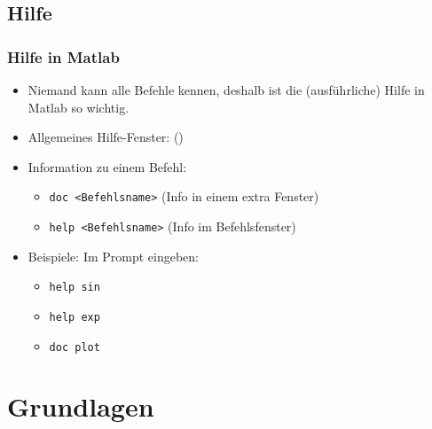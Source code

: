     \subsection{Hilfe}
    \begin{frame}
      \frametitle{Hilfe in Matlab}
      \begin{itemize}
        \itemsep0.3cm
        \item Niemand kann alle Befehle kennen, deshalb ist die (ausführliche) Hilfe in Matlab so wichtig.
        \item Allgemeines Hilfe-Fenster:  ()
        \item Information zu einem Befehl:

        \begin{itemize}
          \itemsep0.3cm
          \item \colorbox{bg}{\texttt{doc <Befehlsname>}} (Info in einem extra Fenster)
          \item \colorbox{bg}{\texttt{help <Befehlsname>}} (Info im Befehlsfenster)
        \end{itemize}

        \item Beispiele: Im Prompt eingeben:

        \begin{itemize}
          \itemsep0.3cm
          \item \colorbox{bg}{\texttt{help sin}}
          \item \colorbox{bg}{\texttt{help exp}}
          \item \colorbox{bg}{\texttt{doc plot}}
        \end{itemize}
      \end{itemize}
    \end{frame}

    \section{Grundlagen}
